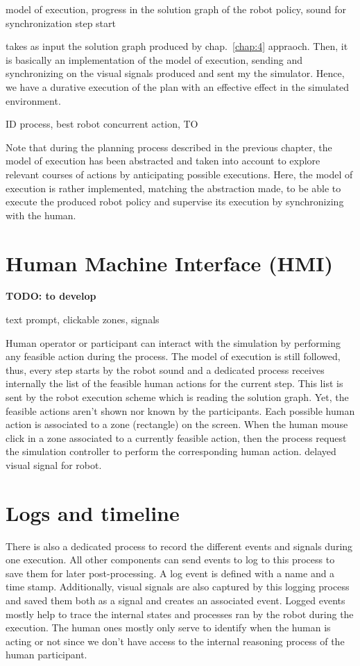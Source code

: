 model of execution, progress in the solution graph of the robot policy, sound for synchronization step start

takes as input the solution graph produced by chap.~\ref{chap:4} appraoch. Then, it is basically an implementation of the model of execution, sending and synchronizing on the visual signals produced and sent my the simulator. Hence, we have a durative execution of the plan with an effective effect in the simulated environment.

ID process, best robot concurrent action, TO 

Note that during the planning process described in the previous chapter, the model of execution has been abstracted and taken into account to explore relevant courses of actions by anticipating possible executions. Here, the model of execution is rather implemented, matching the abstraction made, to be able to execute the produced robot policy and supervise its execution by synchronizing with the human.

\section{Human Machine Interface (HMI)}

\textbf{TODO: to develop}

text prompt, clickable zones, signals

Human operator or participant can interact with the simulation by performing any feasible action during the process. The model of execution is still followed, thus, every step starts by the robot sound and a dedicated process receives internally the list of the feasible human actions for the current step. This list is sent by the robot execution scheme which is reading the solution graph. Yet, the feasible actions aren't shown nor known by the participants.
Each possible human action is associated to a zone (rectangle) on the screen. When the human mouse click in a zone associated to a currently feasible action, then the process request the simulation controller to perform the corresponding human action.  delayed visual signal for robot.

\section{Logs and timeline}

There is also a dedicated process to record the different events and signals during one execution. All other components can send events to log to this process to save them for later post-processing. A log event is defined with a name and a time stamp. Additionally, visual signals are also captured by this logging process and saved them both as a signal and creates an associated event. Logged events mostly help to trace the internal states and processes ran by the robot during the execution. The human ones mostly only serve to identify when the human is acting or not since we don't have access to the internal reasoning process of the human participant. 

